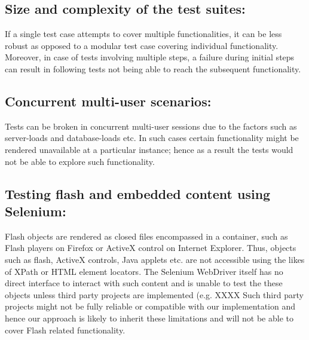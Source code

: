 \subsection{Size and complexity of the test suites: }\label{sec:TestComplexity}
If a single test case attempts to cover multiple functionalities, it can be less robust as opposed to a modular test case covering individual functionality. Moreover, in case of tests involving multiple steps, a failure during initial steps can result in following tests not being able to reach the subsequent functionality.

\subsection{Concurrent multi-user scenarios: }
Tests can be broken in concurrent multi-user sessions due to the factors such as server-loads and database-loads etc. In such cases certain functionality might be rendered unavailable at a particular instance; hence as a result the tests would not be able to explore such functionality.

\subsection{Testing flash and embedded content using Selenium: }
\label{sec:FlashChanges}
Flash objects are rendered as closed files encompassed in a container, such as Flash players on Firefox or ActiveX control on Internet Explorer. Thus, objects such as flash, ActiveX controls, Java applets etc. are not accessible using the likes of XPath or HTML element locators. The Selenium WebDriver itself has no direct interface to interact with such content and is unable to test the these objects unless third party projects are implemented (e.g. XXXX Such third party projects might not be fully reliable or compatible with our implementation and hence our approach is likely to inherit these limitations and will not be able to cover Flash related functionality.

